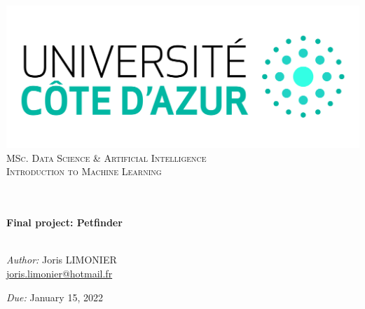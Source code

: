 \begin{titlepage}
	\begin{center}
		\includegraphics[width=\textwidth]{images/logo_uca.jpeg}\\[0.1cm]
		\vspace{1.5cm}
		\textsc{\Large MSc. Data Science \& Artificial Intelligence}\\[1.2cm]
		\textsc{\Large Introduction to Machine Learning}\\[1.2cm]
		\\
		\vspace{1cm}
		
		\HRule \\[0.6cm]
		{\huge \bfseries Final project: Petfinder}\\[0.4cm]
		\HRule \\[1.5cm]
		\vspace{1cm}
		
		\vfill
		\large
		\emph{Author:} Joris LIMONIER\\
		\vspace{.2cm}
		\href{mailto:joris.limonier@hotmail.fr}{joris.limonier@hotmail.fr}\\
		\vspace{.2cm}


		\emph{Due:} {\large January 15, 2022}
	\end{center}
\end{titlepage}


